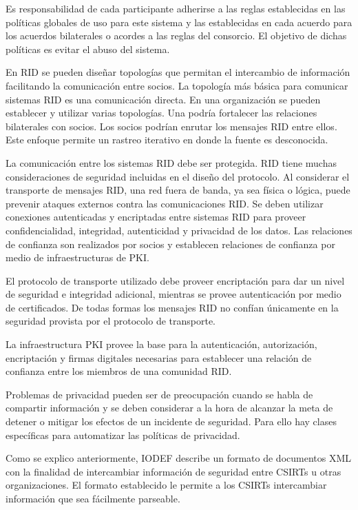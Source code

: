 Es responsabilidad de cada participante adherirse a las reglas establecidas en 
las políticas globales de uso para este sistema y las establecidas en cada 
acuerdo para los acuerdos bilaterales o acordes a las reglas del consorcio. El 
objetivo de dichas políticas es evitar el abuso del sistema.

En RID se pueden diseñar topologías que permitan el intercambio de información 
facilitando la comunicación entre socios. La topología más básica para comunicar sistemas RID es una comunicación directa. 
En una organización se pueden establecer y utilizar varias topologías. Una podría 
fortalecer las relaciones bilaterales con socios. Los socios podrían enrutar los 
mensajes RID entre ellos. Este enfoque permite un rastreo iterativo en donde 
la fuente es desconocida.

La comunicación entre los sistemas RID debe ser protegida. RID tiene muchas 
consideraciones de seguridad incluidas en el diseño del protocolo. Al considerar 
el transporte de mensajes RID, una red fuera de banda, ya sea física o lógica, 
puede prevenir ataques externos contra las comunicaciones RID. Se deben utilizar 
conexiones autenticadas y encriptadas entre sistemas RID para proveer 
confidencialidad, integridad, autenticidad y privacidad de los datos. Las 
relaciones de confianza son realizados por socios y establecen relaciones de 
confianza por medio de infraestructuras de PKI.

El protocolo de transporte utilizado debe proveer encriptación para dar un nivel 
de seguridad e integridad adicional, mientras se provee autenticación por medio 
de certificados. De todas formas los mensajes RID no confían únicamente en la 
seguridad provista por el protocolo de transporte.

La infraestructura PKI provee la base para la autenticación, autorización, 
encriptación y firmas digitales necesarias para establecer una relación de 
confianza entre los miembros de una comunidad RID. 

Problemas de privacidad pueden ser de preocupación cuando se habla de compartir 
información y se deben considerar a la hora de alcanzar la meta de detener o 
mitigar los efectos de un incidente de seguridad. Para ello hay clases 
específicas para automatizar las políticas de privacidad.

Como se explico anteriormente, IODEF describe un formato de documentos XML con 
la finalidad de intercambiar información de seguridad entre CSIRTs u otras 
organizaciones. El formato establecido le permite a los CSIRTs intercambiar 
información que sea fácilmente parseable.

